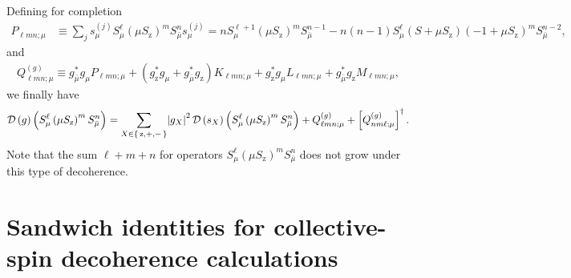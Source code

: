 \documentclass[pra,twocolumn,longbibliography]{revtex4-2}
\newcommand{\p}[1]{\left( #1 \right)} %
\renewcommand{\sp}[1]{\left[ #1 \right]} %
\newcommand{\D}{\mathcal{D}}
\newcommand{\z}{\text{z}}
\newcommand{\bmu}{{\bar\mu}}
\newcommand{\1}{\mathds{1}}
\begin{document}
Defining for completion
\begin{align}
  P_{\ell mn;\mu}
  &\equiv \sum_j s_\mu^{(j)} S_\mu^\ell
  \p{\mu S_\z}^m S_\bmu^n s_\mu^{(j)}
  = n S_\mu^{\ell+1} \p{\mu S_\z}^m S_\bmu^{n-1}
  - n\p{n-1} S_\mu^\ell \p{S+\mu S_\z} \p{-1+\mu S_\z}^m S_\bmu^{n-2},
\end{align}
and
\begin{align}
  Q_{\ell mn;\mu}^{(g)}
  \equiv g_\bmu^* g_\mu P_{\ell mn;\mu}
  + \p{g_\z^* g_\mu + g_\bmu^* g_\z}
  K_{\ell mn;\mu}
  + g_\z^* g_\mu L_{\ell mn;\mu}
  + g_\bmu^* g_\z M_{\ell mn;\mu},
  \label{eq:Q_single}
\end{align}
we finally have
\begin{align}
  \D\p{g} \p{S_\mu^\ell \p{\mu S_\z}^m S_\bmu^n}
  = \sum_{X\in\set{\z,+,-}} \abs{g_X}^2
  \D\p{s_X} \p{S_\mu^\ell \p{\mu S_\z}^m S_\bmu^n}
  + Q_{\ell mn;\mu}^{(g)} + \sp{Q_{nm\ell;\mu}^{(g)}}^\dag.
\end{align}
Note that the sum $\ell+m+n$ for operators
$S_\mu^\ell \p{\mu S_\z}^m S_\bmu^n$ does not grow under this type of
decoherence.


\section{Sandwich identities for collective-spin decoherence
  calculations}
\label{sec:sandwich_collective}
\end{document}
